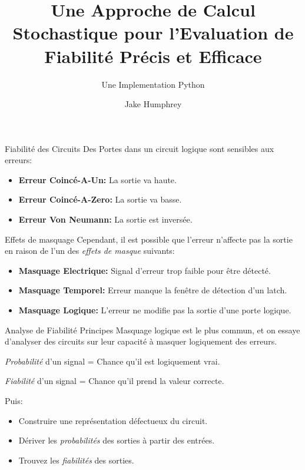 \documentclass [12pt]{beamer}
\author{Jake Humphrey}
\title{Une Approche de Calcul Stochastique pour l'Evaluation de Fiabilité Précis et Efficace}
\subtitle{Une Implementation Python}
\institute{Department of Electronic and Electrical Engineering\\
  Imperial College London\\
  \texttt{jbh111@ic.ac.uk}
}
\begin{document}
\begin{frame}[plain]
  \titlepage
\end{frame}

\begin{frame}{Fiabilité des Circuits}
Des Portes dans un circuit logique sont sensibles aux erreurs:
\begin{itemize}
\item \textbf{Erreur Coincé-A-Un:} La sortie va haute.
\item \textbf{Erreur Coincé-A-Zero:} La sortie va basse.
\item \textbf{Erreur Von Neumann:} La sortie est inversée.
\end{itemize}
\end{frame}

\begin{frame}{Effets de masquage}
Cependant, il est possible que l'erreur n'affecte pas la sortie en raison de l'un des \emph{effets de masque} suivants:
\begin{itemize}
\item \textbf{Masquage Electrique:} Signal d'erreur trop faible pour être détecté.
\item \textbf{Masquage Temporel:} Erreur manque la fenêtre de détection d'un latch.
\item \textbf{Masquage Logique:} L'erreur ne modifie pas la sortie d'une porte logique.
\end{itemize}
\end{frame}
\begin{frame}{Analyse de Fiabilité \small Principes}
Masquage logique est le plus commun, et on essaye d'analyser des circuits sur leur capacité à masquer logiquement des erreurs.
\vspace{0.25cm}

\emph{Probabilité} d'un signal = Chance qu'il est logiquement vrai.

\emph{Fiabilité} d'un signal = Chance qu'il prend la valeur correcte.
\vspace{0.25cm}

Puis:
\begin{itemize}
\item Construire une représentation défectueux du circuit.
\item Dériver les \emph{probabilités} des sorties à partir des entrées.
\item Trouvez les \emph{fiabilités} des sorties.
\end{itemize}
\end{frame}
\end{document}
